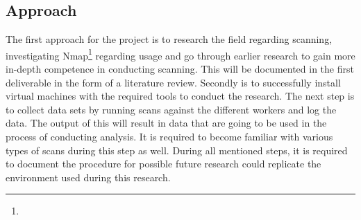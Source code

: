 \subsection{Approach}
\label{ss:Approach}


The first approach for the project is to research the field regarding scanning, investigating Nmap\footnote{} regarding usage and go through earlier research to gain more in-depth competence in conducting scanning.
This will be documented in the first deliverable in the form of a literature review.
Secondly is to successfully install virtual machines with the required tools to conduct the research.
The next step is to collect data sets by running scans against the different workers and log the data.
The output of this will result in data that are going to be used in the process of conducting analysis. It is required to become familiar with various types of scans during this step as well.
During all mentioned steps, it is required to document the procedure for possible future research could replicate the environment used during this research.

